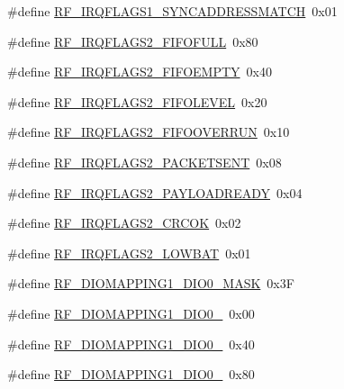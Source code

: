 \begin{DoxyCompactItemize}
\item 
\#define \mbox{\hyperlink{sx1276_regs-_fsk_8h_a9773a75aa15a6e081ee08400d0c99bdc}{R\+F\+\_\+\+I\+R\+Q\+F\+L\+A\+G\+S1\+\_\+\+S\+Y\+N\+C\+A\+D\+D\+R\+E\+S\+S\+M\+A\+T\+CH}}~0x01
\item 
\#define \mbox{\hyperlink{sx1276_regs-_fsk_8h_abd1e80863cab37648e006f1b10c8a099}{R\+F\+\_\+\+I\+R\+Q\+F\+L\+A\+G\+S2\+\_\+\+F\+I\+F\+O\+F\+U\+LL}}~0x80
\item 
\#define \mbox{\hyperlink{sx1276_regs-_fsk_8h_a3dab8f9ed1df7682ad585cb7d88fb9d6}{R\+F\+\_\+\+I\+R\+Q\+F\+L\+A\+G\+S2\+\_\+\+F\+I\+F\+O\+E\+M\+P\+TY}}~0x40
\item 
\#define \mbox{\hyperlink{sx1276_regs-_fsk_8h_a7740115745a3a932a9b7af0560632e42}{R\+F\+\_\+\+I\+R\+Q\+F\+L\+A\+G\+S2\+\_\+\+F\+I\+F\+O\+L\+E\+V\+EL}}~0x20
\item 
\#define \mbox{\hyperlink{sx1276_regs-_fsk_8h_ab8c3186a58e855c916590aafbef08cc6}{R\+F\+\_\+\+I\+R\+Q\+F\+L\+A\+G\+S2\+\_\+\+F\+I\+F\+O\+O\+V\+E\+R\+R\+UN}}~0x10
\item 
\#define \mbox{\hyperlink{sx1276_regs-_fsk_8h_ab17c87d7c87bb0cf9eae4db77b2902c9}{R\+F\+\_\+\+I\+R\+Q\+F\+L\+A\+G\+S2\+\_\+\+P\+A\+C\+K\+E\+T\+S\+E\+NT}}~0x08
\item 
\#define \mbox{\hyperlink{sx1276_regs-_fsk_8h_a31da28dd399ab411a7f35f1c3d5295a8}{R\+F\+\_\+\+I\+R\+Q\+F\+L\+A\+G\+S2\+\_\+\+P\+A\+Y\+L\+O\+A\+D\+R\+E\+A\+DY}}~0x04
\item 
\#define \mbox{\hyperlink{sx1276_regs-_fsk_8h_a55a4b43de7fb4852a6ffe0cf6eee98f7}{R\+F\+\_\+\+I\+R\+Q\+F\+L\+A\+G\+S2\+\_\+\+C\+R\+C\+OK}}~0x02
\item 
\#define \mbox{\hyperlink{sx1276_regs-_fsk_8h_a2849a01d5fe3f3476fb31a7ac8e5e34a}{R\+F\+\_\+\+I\+R\+Q\+F\+L\+A\+G\+S2\+\_\+\+L\+O\+W\+B\+AT}}~0x01
\item 
\#define \mbox{\hyperlink{sx1276_regs-_fsk_8h_a9be88c0f522b9fb1e8a43008a84cb4e5}{R\+F\+\_\+\+D\+I\+O\+M\+A\+P\+P\+I\+N\+G1\+\_\+\+D\+I\+O0\+\_\+\+M\+A\+SK}}~0x3F
\item 
\#define \mbox{\hyperlink{sx1276_regs-_fsk_8h_a848521495c2f6025a438a89cd4fe7943}{R\+F\+\_\+\+D\+I\+O\+M\+A\+P\+P\+I\+N\+G1\+\_\+\+D\+I\+O0\+\_}}~0x00
\item 
\#define \mbox{\hyperlink{sx1276_regs-_fsk_8h_a63c7ef74ba01cd3e1552814d638f32fd}{R\+F\+\_\+\+D\+I\+O\+M\+A\+P\+P\+I\+N\+G1\+\_\+\+D\+I\+O0\+\_}}~0x40
\item 
\#define \mbox{\hyperlink{sx1276_regs-_fsk_8h_abc31a276fae19b01be5eb3f8705cd793}{R\+F\+\_\+\+D\+I\+O\+M\+A\+P\+P\+I\+N\+G1\+\_\+\+D\+I\+O0\+\_}}~0x80

\end{DoxyCompactItemize}
